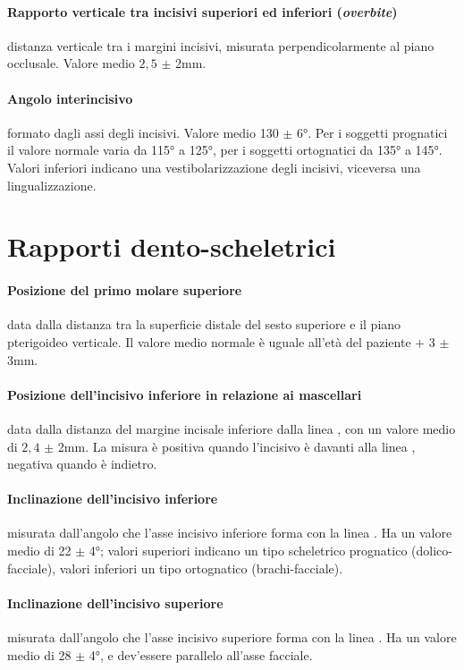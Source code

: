 \paragraph{Rapporto verticale tra incisivi superiori ed inferiori (\textit{overbite})} distanza verticale tra i margini incisivi, misurata perpendicolarmente al piano occlusale. Valore medio $2,5$ $\pm$ 2mm.

\paragraph{Angolo interincisivo} formato dagli assi degli incisivi. Valore medio 130 $\pm$ 6°. Per i soggetti prognatici il valore normale varia da 115° a 125°, per i soggetti ortognatici da 135° a 145°. Valori inferiori indicano una vestibolarizzazione degli incisivi, viceversa una lingualizzazione.

\section{Rapporti dento-scheletrici}

\paragraph{Posizione del primo molare superiore} data dalla distanza tra la superficie distale del sesto superiore e il piano pterigoideo verticale. Il valore medio normale è uguale all'età del paziente $+$ 3 $\pm$ 3mm.

\paragraph{Posizione dell'incisivo inferiore in relazione ai mascellari} data dalla distanza del margine incisale inferiore dalla linea , con un valore medio di $2,4$ $\pm$ 2mm. La misura è positiva quando l'incisivo è davanti alla linea , negativa quando è indietro.

\paragraph{Inclinazione dell'incisivo inferiore} misurata dall'angolo che l'asse incisivo inferiore forma con la linea . Ha un valore medio di 22 $\pm$ 4°; valori superiori indicano un tipo scheletrico prognatico (dolico-facciale), valori inferiori un tipo ortognatico (brachi-facciale).

\paragraph{Inclinazione dell'incisivo superiore} misurata dall'angolo che l'asse incisivo superiore forma con la linea . Ha un valore medio di 28 $\pm$ 4°, e dev'essere parallelo all'asse facciale.


